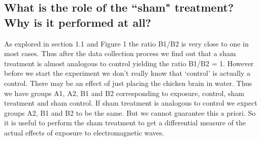 \documentclass{article}
\begin{document}
\subsection{What is the role of the ``sham" treatment? Why is it performed at all?}
As explored in section 1.1 and Figure 1 the ratio B1/B2 is very close to one in most cases. Thus after the data collection process we find out that a sham treatment is almost analogous to control yielding the ratio B1/B2  = 1. However before we start the experiment we don't really know that `control' is actually a control. There may be an effect of just placing the chicken brain in water. Thus we have groups A1, A2, B1 and B2 corresponding to exposure, control, sham treatment and sham control. If sham treatment is analogous to control we expect groups A2, B1 and B2 to be the same. But we cannot guarantee this a priori. So it is useful to perform the sham treatment to get a differential measure of the actual effects of exposure to electromagnetic waves.
\end{document}
